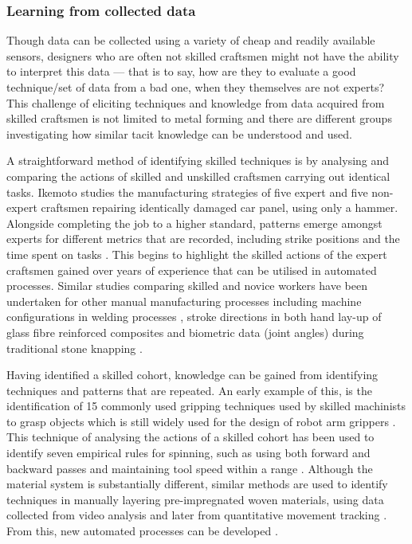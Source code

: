 \subsubsection{Learning from collected data}
Though data can be collected using a variety of cheap and readily available sensors, designers who are often not skilled craftsmen might not have the ability to interpret this data --- that is to say, how are they to evaluate a good technique/set of data from a bad one, when they themselves are not experts? 
This challenge of eliciting techniques and knowledge from data acquired from skilled craftsmen is not limited to metal forming and there are different groups investigating how similar tacit knowledge can be understood and used.

A straightforward method of identifying skilled techniques is by analysing and comparing the actions of skilled and unskilled craftsmen carrying out identical tasks. Ikemoto studies the manufacturing strategies of five expert and five non-expert craftsmen repairing identically damaged car panel, using only a hammer.  Alongside completing the job to a higher standard, patterns emerge amongst experts for different metrics that are recorded, including strike positions \citep{Ikemoto2018ProcessRepair} and the time spent on tasks \citep{Ikemoto2016ARepair}. This begins to highlight the skilled actions of the expert craftsmen gained over years of experience that can be utilised in automated processes. Similar studies comparing skilled and novice workers have been undertaken for other manual manufacturing processes including machine configurations in welding processes \citep{Manorathna2017HumanAutomation}, stroke directions in both hand lay-up of glass fibre reinforced composites \citep{Xie2016EffectMethod, Kikuchi2016ResearchLay-up} and biometric data (joint angles) during traditional stone knapping \citep{Rein2014MovementTraditions}. 

Having identified a skilled cohort, knowledge can be gained from identifying techniques and patterns that are repeated. An early example of this, is the identification of 15 commonly used gripping techniques used by skilled machinists to grasp objects \citep{Cutkosky1986ModellingHands} which is still widely used for the design of robot arm grippers \citep{Feix2016TheTypes}. This technique of analysing the actions of a skilled cohort has been used to identify seven empirical rules for spinning, such as using both forward and backward passes and maintaining tool speed within a range \citep{Russo2020ResearchSpinning}.
Although the material system is substantially different, similar methods are used to identify techniques in manually layering pre-impregnated woven materials, using data collected from video analysis \citep{Elkington2015HandProcess, Elkington2015StudyingLayup} and later from quantitative movement tracking \citep{Prabhu2017DigitisationTechnology}. From this, new automated processes can be developed \citep{Elkington2016AutomatedMoulds}.

